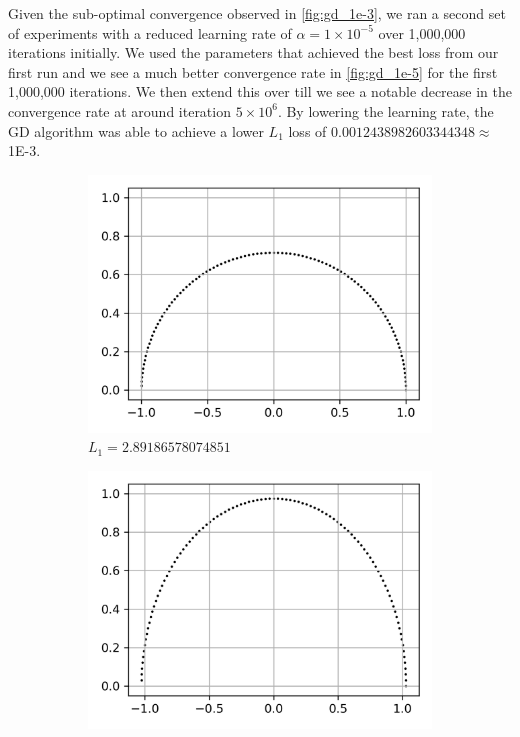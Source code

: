 \documentclass[a4paper]{report}
\begin{document}
Given the sub-optimal convergence observed in \autoref{fig:gd_1e-3}, we ran a second set of experiments with a reduced learning rate of $\alpha = 1 \times 10^{-5}$ over 1,000,000 iterations initially. We used the parameters that achieved the best loss from our first run and we see a much better convergence rate in \autoref{fig:gd_1e-5} for the first 1,000,000 iterations. We then extend this over till we see a notable decrease in the convergence rate at around iteration $5 \times 10^{6}$. By lowering the learning rate, the GD algorithm was able to achieve a lower $L_1$ loss of $0.0012438982603344348 \approx $ 1E-3.

\begin{figure}[H]
    \begin{subfigure}{.33\linewidth}
      \includegraphics[width=\linewidth]{images/gd/initial_params_GD.png}
      \caption{$L_1 = 2.89186578074851$}
      \label{fig:gd_initial_params}
    \end{subfigure}\hfill
    \begin{subfigure}{.33\linewidth}
      \includegraphics[width=\linewidth]{images/gd/params_after_first_GD.png}

\end{subfigure}
\end{figure}
\end{document}
